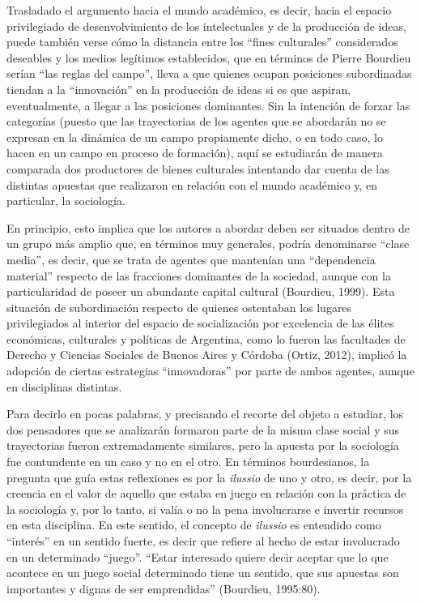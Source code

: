 Trasladado el argumento hacia el mundo académico, es decir, hacia el espacio privilegiado de desenvolvimiento de los intelectuales y de la producción de ideas, puede también verse cómo la distancia entre los ``fines culturales'' considerados deseables y los medios legítimos establecidos, que en términos de Pierre Bourdieu serían ``las reglas del campo'', lleva a que quienes ocupan posiciones subordinadas tiendan a la ``innovación'' en la producción de ideas si es que aspiran, eventualmente, a llegar a las posiciones dominantes. Sin la intención de forzar las categorías (puesto que las trayectorias de los agentes que se abordarán no se expresan en la dinámica de un campo propiamente dicho, o en todo caso, lo hacen en un campo en proceso de formación), aquí se estudiarán de manera comparada dos productores de bienes culturales intentando dar cuenta de las distintas apuestas que realizaron en relación con el mundo académico y, en particular, la sociología.

En principio, esto implica que los autores a abordar deben ser situados dentro de un grupo más amplio que, en términos muy generales, podría denominarse ``clase media'', es decir, que se trata de agentes que mantenían una ``dependencia material'' respecto de las fracciones dominantes de la sociedad, aunque con la particularidad de poseer un abundante capital cultural (Bourdieu, 1999). Esta situación de subordinación respecto de quienes ostentaban los lugares privilegiados al interior del espacio de socialización por excelencia de las élites económicas, culturales y políticas de Argentina, como lo fueron las facultades de Derecho y Ciencias Sociales de Buenos Aires y Córdoba \parencite{277-AGUERO2017}(Ortiz, 2012), implicó la adopción de ciertas estrategias ``innovadoras'' por parte de ambos agentes, aunque en disciplinas distintas.

Para decirlo en pocas palabras, y precisando el recorte del objeto a estudiar, los dos pensadores que se analizarán formaron parte de la misma clase social y sus trayectorias fueron extremadamente similares, pero la apuesta por la sociología fue contundente en un caso y no en el otro. En términos bourdesianos, la pregunta que guía estas reflexiones es por la \emph{ilussio} de uno y otro, es decir, por la creencia en el valor de aquello que estaba en juego en relación con la práctica de la sociología y, por lo tanto, si valía o no la pena involucrarse e invertir recursos en esta disciplina. En este sentido, el concepto de \emph{ilussio} es entendido como ``interés'' en un sentido fuerte, es decir que refiere al hecho de estar involucrado en un determinado ``juego''. ``Estar interesado quiere decir aceptar que lo que acontece en un juego social determinado tiene un sentido, que sus apuestas son importantes y dignas de ser emprendidas'' (Bourdieu, 1995:80).

